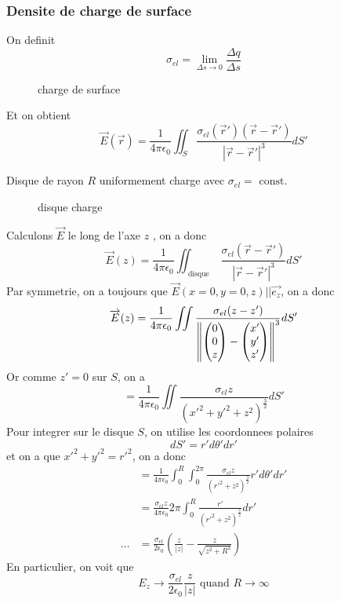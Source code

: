 \documentclass[../main.tex]{subfiles}
\begin{document}
\subsubsection{Densite de charge de surface}
On definit
\[ 
\sigma_{el } = \lim_{\Delta s \to 0} \frac{\Delta q}{\Delta s}
\]
\begin{figure}[H]
    \centering
    \caption{charge de surface}
    \label{fig:charge-de-surface}
\end{figure}
Et on obtient
\[ 
	\vec{E}( \vec{r}) = \frac{1}{4 \pi \epsilon_0} \iint_S \frac{\sigma_{el } ( \vec{r}') ( \vec{r}- \vec{r}') }{| \vec{r}- \vec{r}'| ^{3}} dS'
\]
\begin{exemple}
Disque de rayon $R$ uniformement charge avec $\sigma_{el } = \text{ const. } $ 
\begin{figure}[H]
    \centering
    \caption{disque charge}
    \label{fig:disque-charge}
\end{figure}
Calculons $\vec{E}$ le long de l'axe $z$ , on a donc
\[ 
	\vec{E}( z) = \frac{1}{4 \pi \epsilon_0} \iint_{ \text{ disque } }  \frac{\sigma_{el} ( \vec{r}- \vec{r}')  }{| \vec{r}- \vec{r}'|^{3}} dS'
\]
Par symmetrie, on a toujours que $ \vec{E}( x=0,y=0,z)  || \vec{e_z}$, on a donc
\[ 
	\overrightarrow{E}( z)  = \frac{1 }{4 \pi \epsilon_0} \iint \frac{\sigma_{el } ( z-z') }{\left\lVert \begin{pmatrix}
	0\\0\\z
	\end{pmatrix}
	- \begin{pmatrix}
	x'\\y'\\z'
	\end{pmatrix}
	\right\rVert^{3}}d S'
\]
Or comme $z'=0$ sur $S$, on a
\[ 
	= \frac{1}{4 \pi \epsilon_0} \iint \frac{\sigma_{el} z }{ ( x'^{2}+ y'^{2}+ z^{2})^{\frac{3}{2}}}dS'
\]
Pour integrer sur le disque $S$, on utilise les coordonnees polaires 
 \[ 
dS' = r' d\theta ' dr'
\]
et on a que $x'^{2}+ y'^{2}= r'^{2}$, on a donc
\begin{align*}
&= \frac{1}{4 \pi \epsilon_0} \int_{ 0 }^{ R } \int_{ 0  }^{ 2 \pi } \frac{\sigma_{el } z}{ ( r'^{2}+ z^{2}) ^{\frac{3}{2}}} r' d\theta' dr'\\
&= \frac{\sigma_{el } z}{4 \pi \epsilon_0}2 \pi  \int_{ 0 }^{ R } \frac{r'}{( r'^{2}+z^{2}) ^{\frac{3}{2}} } dr'\\
	\ldots &= \frac{\sigma_{el } }{2 \epsilon_0} \left(  \frac{z}{|z|} - \frac{z}{ \sqrt{z^{2} + R^{2}} }\right) 
\end{align*}
En particulier, on voit que 
 \[ 
E_z \to \frac{\sigma_{el } }{2 \epsilon_0} \frac{z}{|z|} \text{ quand } R\to \infty 
\]

\end{exemple}
\end{document}
